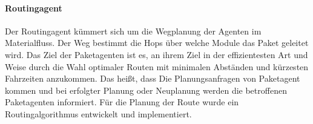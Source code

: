 \paragraph{Routingagent}
Der Routingagent kümmert sich um die Wegplanung der Agenten im Materialfluss. Der Weg bestimmt die Hops über welche Module das Paket geleitet wird.
Das Ziel der Paketagenten ist es, an ihrem Ziel in der effizientesten Art und Weise durch die Wahl optimaler Routen  mit minimalen Abständen und kürzesten Fahrzeiten anzukommen. Das heißt, dass Die Planungsanfragen
von Paketagent kommen und bei erfolgter Planung oder Neuplanung werden die betroffenen Paketagenten informiert.
Für die Planung der Route wurde ein Routingalgorithmus entwickelt und implementiert.